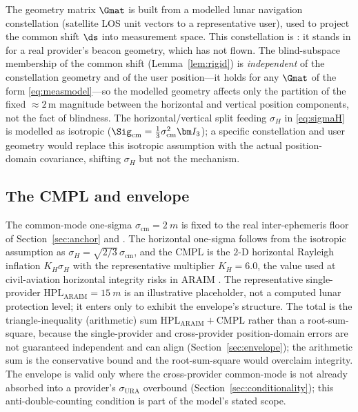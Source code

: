 The geometry matrix $\Gmat$ is built from a modelled lunar navigation constellation
(satellite LOS unit vectors to a representative user), used to project the common shift
$\ds$ into measurement space. This constellation is \Modelled{}: it stands in for a real
provider's beacon geometry, which has not flown. The blind-subspace membership of the
common shift (Lemma~\ref{lem:rigid}) is \emph{independent} of the constellation geometry
and of the user position---it holds for any $\Gmat$ of the form \eqref{eq:measmodel}---so
the modelled geometry affects only the partition of the fixed $\approx\!2\,$m magnitude
between the horizontal and vertical position components, not the fact of blindness. The
horizontal/vertical split feeding $\sigma_H$ in \eqref{eq:sigmaH} is modelled as
isotropic ($\Sig_{\mathrm{cm}}=\tfrac{1}{3}\sigma_{\mathrm{cm}}^2\bm I_3$); a specific
constellation and user geometry would replace this isotropic assumption with the actual
position-domain covariance, shifting $\sigma_H$ but not the mechanism.

\subsection{The CMPL and envelope}
\label{app:cmpl}

The common-mode one-sigma $\sigma_{\mathrm{cm}}=\SI{2}{m}$ is fixed to the real
inter-ephemeris floor of Section~\ref{sec:anchor} and \citep{baweja2026interop}. The
horizontal one-sigma follows from the isotropic assumption as
$\sigma_H=\sqrt{2/3}\,\sigma_{\mathrm{cm}}$, and the CMPL is the $2$-D horizontal Rayleigh
inflation $K_H\sigma_H$ with the representative multiplier $K_H=6.0$, the value used at
civil-aviation horizontal integrity risks in ARAIM \citep{blanch2015,wgc2016araim}. The
representative single-provider $\mathrm{HPL}_{\mathrm{ARAIM}}=\SI{15}{m}$ is an
illustrative placeholder, not a computed lunar protection level; it enters only to
exhibit the envelope's structure. The total is the triangle-inequality (arithmetic) sum
$\mathrm{HPL}_{\mathrm{ARAIM}}+\mathrm{CMPL}$ rather than a root-sum-square, because the
single-provider and cross-provider position-domain errors are not guaranteed independent
and can align (Section~\ref{sec:envelope}); the arithmetic sum is the conservative bound
and the root-sum-square would overclaim integrity. The envelope is valid only where the
cross-provider common-mode is not already absorbed into a provider's
$\sigma_{\mathrm{URA}}$ overbound (Section~\ref{sec:conditionality}); this
anti-double-counting condition is part of the model's stated scope.
